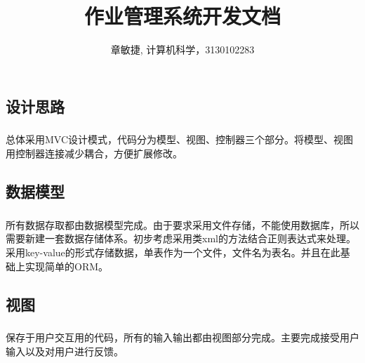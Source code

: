 \documentclass[notitlepage,cs4size,punct,oneside]{report}
\begin{document}
\begin{CJK}{UTF8}{hei} %


\renewcommand{\abstractname}{摘 \qquad 要}
\renewcommand{\contentsname}{\center 目\qquad\qquad 录}
\renewcommand{\listfigurename}{图 \quad 示 \quad 目 \quad 录}
\renewcommand{\listtablename}{表 \quad 格 \quad 目 \quad 录}
\renewcommand{\appendixname}{附录}
\renewcommand{\chaptername}{章节}
\renewcommand{\indexname}{\center 索 \qquad 引}
\renewcommand{\figurename}{图}
\renewcommand{\tablename}{表}

\newcommand{\upcite}[1]{\textsuperscript{\cite{#1}}}


\title{作业管理系统开发文档}
\author{章敏捷, 计算机科学，3130102283}

\maketitle
\tableofcontents
\pagebreak



\chapter{设计思路}
\paragraph{}总体采用MVC设计模式，代码分为模型、视图、控制器三个部分。将模型、视图用控制器连接减少耦合，方便扩展修改。
\section{数据模型}
\paragraph{}所有数据存取都由数据模型完成。由于要求采用文件存储，不能使用数据库，所以需要新建一套数据存储体系。初步考虑采用类xml的方法结合正则表达式来处理。采用key-value的形式存储数据，单表作为一个文件，文件名为表名。并且在此基础上实现简单的ORM。
\section{视图}
\paragraph{}
保存于用户交互用的代码，所有的输入输出都由视图部分完成。主要完成接受用户输入以及对用户进行反馈。

\end{CJK}
\end{document}
